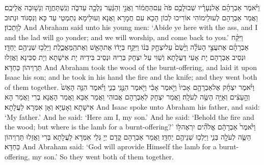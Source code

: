 {וַיֹּ֨אמֶר אַבְרָהָ֜ם אֶל\maqqaf נְעָרָ֗יו שְׁבוּ\maqqaf לָכֶ֥ם פֹּה֙ עִֽם\maqqaf הַחֲמ֔וֹר וַאֲנִ֣י וְהַנַּ֔עַר נֵלְכָ֖ה עַד\maqqaf כֹּ֑ה וְנִֽשְׁתַּחֲוֶ֖ה וְנָשׁ֥וּבָה אֲלֵיכֶֽם׃}
{וַאֲמַר אַבְרָהָם לְעוּלֵימוֹהִי אוֹרִיכוּ לְכוֹן הָכָא עִם חֲמָרָא וַאֲנָא וְעוּלֵימָא נִתְמְטֵי עַד כָּא וְנִסְגּוֹד וּנְתוּב לְוָתְכוֹן׃}
{And Abraham said unto his young men: ‘Abide ye here with the ass, and I and the lad will go yonder; and we will worship, and come back to you.’}{}
{וַיִּקַּ֨ח אַבְרָהָ֜ם אֶת\maqqaf עֲצֵ֣י הָעֹלָ֗ה וַיָּ֙שֶׂם֙ עַל\maqqaf יִצְחָ֣ק בְּנ֔וֹ וַיִּקַּ֣ח בְּיָד֔וֹ אֶת\maqqaf הָאֵ֖שׁ וְאֶת\maqqaf הַֽמַּאֲכֶ֑לֶת וַיֵּלְכ֥וּ שְׁנֵיהֶ֖ם יַחְדָּֽו׃}
{וּנְסֵיב אַבְרָהָם יָת אָעֵי דַּעֲלָתָא וְשַׁוִּי עַל יִצְחָק בְּרֵיהּ וּנְסֵיב בִּידֵיהּ יָת אִישָׁתָא וְיָת סַכִּינָא וַאֲזַלוּ תַּרְוֵיהוֹן כַּחְדָּא׃}
{And Abraham took the wood of the burnt-offering, and laid it upon Isaac his son; and he took in his hand the fire and the knife; and they went both of them together.}{}
{וַיֹּ֨אמֶר יִצְחָ֜ק אֶל\maqqaf אַבְרָהָ֤ם אָבִיו֙ וַיֹּ֣אמֶר אָבִ֔י וַיֹּ֖אמֶר הִנֶּ֣נִּֽי בְנִ֑י וַיֹּ֗אמֶר הִנֵּ֤ה הָאֵשׁ֙ וְהָ֣עֵצִ֔ים וְאַיֵּ֥ה הַשֶּׂ֖ה לְעֹלָֽה׃}
{וַאֲמַר יִצְחָק לְאַבְרָהָם אֲבוּהִי וַאֲמַר אַבָּא וַאֲמַר הָאֲנָא בְרִי וַאֲמַר הָא אִישָׁתָא וְאָעַיָּא וְאָן אִמְּרָא לַעֲלָתָא׃}
{And Isaac spoke unto Abraham his father, and said: ‘My father.’ And he said: ‘Here am I, my son.’ And he said: ‘Behold the fire and the wood; but where is the lamb for a burnt-offering?’}{}
{וַיֹּ֙אמֶר֙ אַבְרָהָ֔ם אֱלֹהִ֞ים יִרְאֶה\maqqaf לּ֥וֹ הַשֶּׂ֛ה לְעֹלָ֖ה בְּנִ֑י וַיֵּלְכ֥וּ שְׁנֵיהֶ֖ם יַחְדָּֽו׃}
{וַאֲמַר אַבְרָהָם קֳדָם יְיָ גְּלֵי אִמְּרָא לַעֲלָתָא בְּרִי וַאֲזַלוּ תַּרְוֵיהוֹן כַּחְדָּא׃}
{And Abraham said: ‘God will aprovide Himself the lamb for a burnt-offering, my son.’ So they went both of them together.}{}

